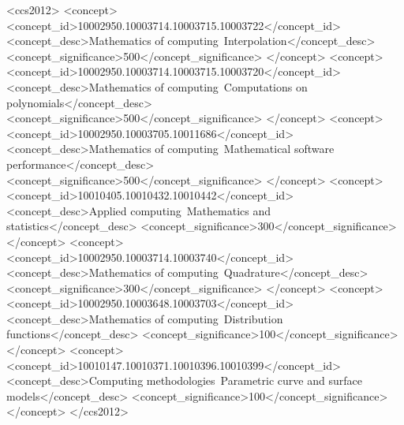 \documentclass[manuscript]{acmart}
\begin{document}
\begin{CCSXML}
<ccs2012>
<concept>
<concept_id>10002950.10003714.10003715.10003722</concept_id>
<concept_desc>Mathematics of computing~Interpolation</concept_desc>
<concept_significance>500</concept_significance>
</concept>
<concept>
<concept_id>10002950.10003714.10003715.10003720</concept_id>
<concept_desc>Mathematics of computing~Computations on polynomials</concept_desc>
<concept_significance>500</concept_significance>
</concept>
<concept>
<concept_id>10002950.10003705.10011686</concept_id>
<concept_desc>Mathematics of computing~Mathematical software performance</concept_desc>
<concept_significance>500</concept_significance>
</concept>
<concept>
<concept_id>10010405.10010432.10010442</concept_id>
<concept_desc>Applied computing~Mathematics and statistics</concept_desc>
<concept_significance>300</concept_significance>
</concept>
<concept>
<concept_id>10002950.10003714.10003740</concept_id>
<concept_desc>Mathematics of computing~Quadrature</concept_desc>
<concept_significance>300</concept_significance>
</concept>
<concept>
<concept_id>10002950.10003648.10003703</concept_id>
<concept_desc>Mathematics of computing~Distribution functions</concept_desc>
<concept_significance>100</concept_significance>
</concept>
<concept>
<concept_id>10010147.10010371.10010396.10010399</concept_id>
<concept_desc>Computing methodologies~Parametric curve and surface models</concept_desc>
<concept_significance>100</concept_significance>
</concept>
</ccs2012>
\end{CCSXML}


\end{document}
